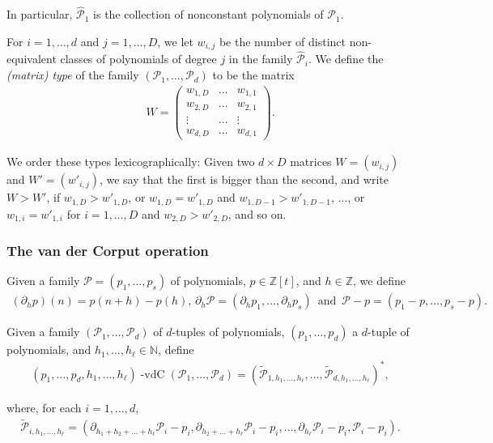 \documentclass[11pt,reqno]{amsart}
\newcommand{\Z}{\mathbb{Z}}
\newcommand{\N}{\mathbb{N}}
\newcommand{\cP}{{\mathcal P}}
\DeclareMathOperator{\vdc}{-vdC}
\theoremstyle{definition}
\theoremstyle{remark}
\begin{document}
In particular, $\widehat{\cP}_1$ is the collection of nonconstant polynomials of $\cP_1$.

For $i=1,\ldots, d$ and $j=1,\ldots, D$, we let $w_{i,j}$ be the number of distinct non-equivalent classes of polynomials of degree $j$ in the family $\widehat{\cP}_i$. We define the \emph{(matrix) type} of the family $(\cP_1,\ldots, \cP_d)$ to be the matrix\begin{align*}
    W=\begin{pmatrix}
w_{1,D}& \ldots &  w_{1,1}\\ w_{2,D}& \ldots& w_{2,1}\\ \vdots & \ldots &\vdots \\
w_{d,D}& \ldots& w_{d,1}
\end{pmatrix}.
\end{align*}

We order these  types  lexicographically: Given two $d\times D$ matrices $W=(w_{i,j})$ and $W'=(w'_{i,j})$, we say that the first is bigger than the second, and write $W>W'$, if $w_{1,D}>w'_{1,D}$, or $w_{1,D}=w'_{1,D}$ and $w_{1,D-1}>w'_{1,D-1}$, $\ldots$, or $w_{1,i}=w'_{1,i}$ for $i=1,\ldots,D$ and $w_{2,D}>w'_{2,D}$, and so on.


\subsubsection{The van der Corput operation}
Given a family $\cP=(p_1,\ldots,p_s)$ of polynomials, $p\in \Z[t]$, and $h\in\Z$, we define
\begin{align*}
    (\partial_h p)(n) = p(n+h)-p(h),\, \partial_h \cP = (\partial_h p_1,\dots, \partial_h p_s)\, \text{ and } \,\cP -p=(p_1-p,\dots,p_s-p).
\end{align*}

Given a family $(\cP_1,\ldots,\cP_d)$ of $d$-tuples of polynomials, $(p_1,\ldots,p_d)$ a $d$-tuple of polynomials, and $h_1,\dots,h_\ell\in\N$, define\begin{align*}
    (p_1,\ldots, p_d,h_1,\dots,h_\ell)\vdc(\cP_1,\ldots, \cP_d) =(\tilde{\cP}_{1,h_1,\dots,h_\ell},\dots ,\tilde{\cP}_{d,h_1,\dots,h_\ell})^*,
\end{align*}

 where, for each $i=1,\dots,d$,\begin{align*}
     \tilde{\cP}_{i,h_1,\dots,h_\ell}=(\partial_{h_1+h_2+\dots+h_\ell}\cP_i-p_i,\partial_{h_2+\dots+h_\ell}\cP_i-p_i,\dots,\partial_{h_\ell}\cP_i-p_i,\cP_i-p_i).
 \end{align*}
\end{document}
